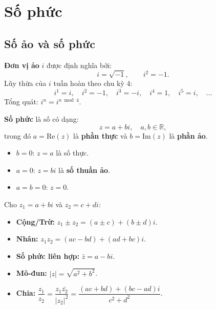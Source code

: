 \documentclass[12pt,a4paper]{article}
\begin{document}
\section{Số phức}

\subsection{Số ảo và số phức}

\begin{dinhnghia}[title={Đơn vị ảo}]
  \textbf{Đơn vị ảo} $i$ được định nghĩa bởi:
  \[
    i = \sqrt{-1}, \qquad i^2 = -1.
  \]
  Lũy thừa của $i$ tuần hoàn theo chu kỳ 4:
  \[
    i^1 = i, \quad i^2 = -1, \quad i^3 = -i, \quad i^4 = 1, \quad i^5 = i, \quad \ldots
  \]
  Tổng quát: $i^n = i^{n \bmod 4}$.
\end{dinhnghia}

\begin{dinhnghia}[title={Số phức}]
  \textbf{Số phức} là số có dạng:
  \[
    z = a + bi, \quad a, b \in \mathbb{R},
  \]
  trong đó $a = \text{Re}(z)$ là \textbf{phần thực} và $b = \text{Im}(z)$ là \textbf{phần ảo}.

  \begin{itemize}
    \item $b = 0$: $z = a$ là số thực.
    \item $a = 0$: $z = bi$ là \textbf{số thuần ảo}.
    \item $a = b = 0$: $z = 0$.
  \end{itemize}
\end{dinhnghia}

\begin{congthuc}[title={Phép toán trên số phức dạng $a + bi$}]
  Cho $z_1 = a + bi$ và $z_2 = c + di$:
  \begin{itemize}
    \item \textbf{Cộng/Trừ:} $z_1 \pm z_2 = (a \pm c) + (b \pm d)i$.
    \item \textbf{Nhân:} $z_1 z_2 = (ac - bd) + (ad + bc)i$.
    \item \textbf{Số phức liên hợp:} $\bar{z} = a - bi$.
    \item \textbf{Mô-đun:} $|z| = \sqrt{a^2 + b^2}$.
    \item \textbf{Chia:} $\dfrac{z_1}{z_2} = \dfrac{z_1 \bar{z_2}}{|z_2|^2} = \dfrac{(ac+bd) + (bc-ad)i}{c^2+d^2}$.
  \end{itemize}
\end{congthuc}
\end{document}
